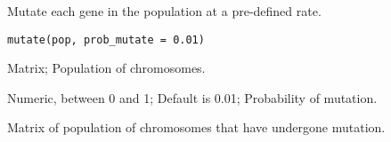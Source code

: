%
\begin{Description}\relax
Mutate each gene in the population at a pre-defined rate.
\end{Description}
%
\begin{Usage}
\begin{verbatim}
mutate(pop, prob_mutate = 0.01)
\end{verbatim}
\end{Usage}
%
\begin{Arguments}
\begin{ldescription}
\item[\code{pop}] Matrix; Population of chromosomes.

\item[\code{prob\_mutate}] Numeric, between 0 and 1; Default is 0.01; Probability of mutation.
\end{ldescription}
\end{Arguments}
%
\begin{Value}
Matrix of population of chromosomes that have undergone mutation.
\end{Value}
